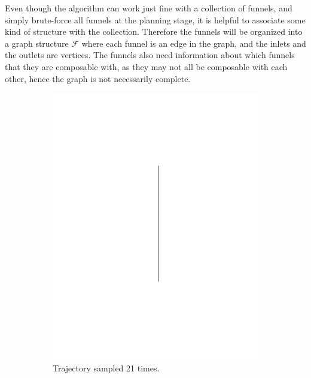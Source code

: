 Even though the \rrtfunnel{} algorithm can work just fine with a collection of
funnels, and simply brute-force all funnels at the planning stage, it is helpful
to associate some kind of structure with the collection. Therefore the funnels
will be organized into a graph structure \(\mathcal{F}\) where each funnel is an
edge in the graph, and the inlets and the outlets are vertices. The funnels also
need information about which funnels that they are composable with, as they may
not all be composable with each other, hence the graph is not necessarily
complete.

\begin{figure}
  \centering
  \begin{subfigure}[b]{0.5\textwidth}
    \includegraphics[trim={5cm 5cm 5cm 5cm},
    width=\textwidth]{figures/method/trajectory-sampled}
    \caption{Trajectory sampled 21 times.\newline}
  \end{subfigure}%
  \begin{subfigure}[b]{0.5\textwidth}

\end{subfigure}
\end{figure}
